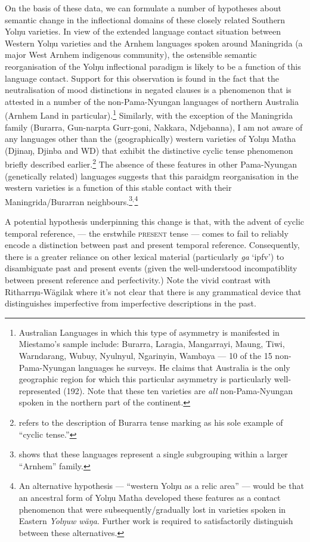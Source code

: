 On the basis of these data, we can formulate a number of hypotheses about semantic change in the inflectional domains of these closely related Southern Yolŋu varieties. In view of the extended language contact situation between Western Yolŋu varieties and the Arnhem languages spoken around Maningrida (a major West Arnhem indigenous community), the ostensible semantic reorganisation of the Yolŋu inflectional paradigm is likely to be a function of this language contact. Support for this observation is found in the fact that the neutralisation of mood distinctions in negated clauses is a phenomenon that is attested in a number of the non-Pama-Nyungan languages of northern Australia (Arnhem Land in particular).\footnote{Australian Languages in which this type of asymmetry is manifested  in Miestamo's \citeyearpar[411]{Miestamo2005} sample include: Burarra, Laragia, Mangarrayi, Maung, Tiwi, Warndarang, Wubuy, Nyulnyul, Ngarinyin, Wambaya --- 10 of the 15 non-Pama-Nyungan languages he surveys. He claims that Australia is the only geographic region for which this particular asymmetry is particularly well-represented (192). Note that these ten varieties are \textit{all}  non-Pama-Nyungan spoken in the northern part of the continent.} Similarly, with the exception of the Maningrida family (Burarra, Gun-narpta Gurr-goni, Nakkara, Ndjebanna), I am not aware of any languages other than the (geographically) western varieties of Yolŋu Matha (Djinaŋ, Djinba and WD) that exhibit the distinctive cyclic tense phenomenon briefly described earlier.\footnote{\citet[75]{Comrie1985} refers to the description of Burarra tense marking \citep{Glasgow1964} as his sole example of ``cyclic tense.''} The absence of these features in other Pama-Nyungan (genetically related) languages suggests that this paraidgm reorganisation in the western varieties is a function of this stable contact with their Maningrida/Burarran neighbours.\footnote{\citet{Green2003} shows that these languages represent a single subgrouping within a larger ``Arnhem'' family.}$ ^, $\footnote{An alternative hypothesis --- ``western Yolŋu as a relic area'' --- would be that an ancestral form of Yolŋu Matha developed these features as a contact phenomenon that were subsequently/gradually lost in varieties spoken in Eastern \textit{Yolŋuw wäŋa}. Further work is required to satisfactorily distinguish between these alternatives.}



A potential hypothesis underpinning this change is that, with the advent of cyclic temporal reference, \I{} --- the erstwhile \textsc{present} tense --- comes to fail to reliably encode a distinction between past and present temporal reference. Consequently, there is a greater reliance on other lexical material (particularly \textit{ga} `\gls{ipfv}') to disambiguate past and present events (given the well-understood incompatiblity between present reference and perfectivity.) Note the vivid contrast with Ritharrŋu-Wägilak where it's not clear that there is any grammatical device that distinguishes imperfective from imperfective descriptions in the past.

